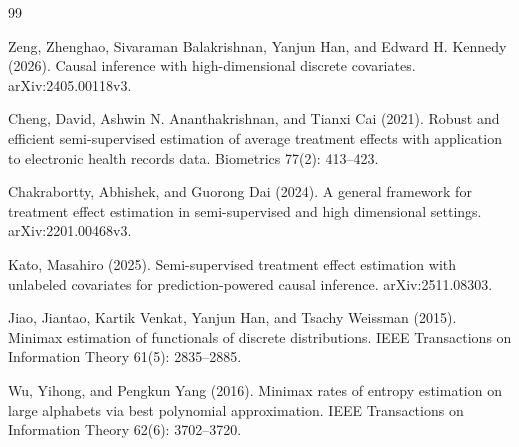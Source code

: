 \documentclass{article}
\begin{document}
\begin{thebibliography}{99}

   Zeng, Zhenghao, Sivaraman Balakrishnan, Yanjun Han, and Edward H. Kennedy (2026). Causal inference with high-dimensional discrete covariates. arXiv:2405.00118v3.

   Cheng, David, Ashwin N. Ananthakrishnan, and Tianxi Cai (2021). Robust and efficient semi-supervised estimation of average treatment effects with application to electronic health records data. Biometrics 77(2): 413--423.

   Chakrabortty, Abhishek, and Guorong Dai (2024). A general framework for treatment effect estimation in semi-supervised and high dimensional settings. arXiv:2201.00468v3.

   Kato, Masahiro (2025). Semi-supervised treatment effect estimation with unlabeled covariates for prediction-powered causal inference. arXiv:2511.08303.

   Jiao, Jiantao, Kartik Venkat, Yanjun Han, and Tsachy Weissman (2015). Minimax estimation of functionals of discrete distributions. IEEE Transactions on Information Theory 61(5): 2835--2885.

   Wu, Yihong, and Pengkun Yang (2016). Minimax rates of entropy estimation on large alphabets via best polynomial approximation. IEEE Transactions on Information Theory 62(6): 3702--3720.

\end{thebibliography}
\end{document}
